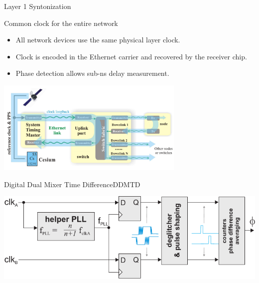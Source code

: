 \documentclass[compress, red]{beamer}
\begin{document}
\begin{frame}{Layer 1 Syntonization}

 \begin{block}{Common clock for the entire network}
    \begin{itemize}
	 \item All network devices use the same physical layer clock.
	 \item Clock is encoded in the Ethernet carrier and recovered by the receiver chip.
	 \item Phase detection allows sub-ns delay measurement.
    \end{itemize}
\end{block}

\vspace{-0.2cm}

\begin{center}
\includegraphics[height=4.5cm]{misc/synce_v3.pdf}
\end{center}

\end{frame}

\begin{frame}{Digital Dual Mixer Time Difference}{DDMTD}

\begin{center}
\includegraphics[width=\textwidth]{misc/dmtd.pdf}
\end{center}

\end{frame}
\end{document}
